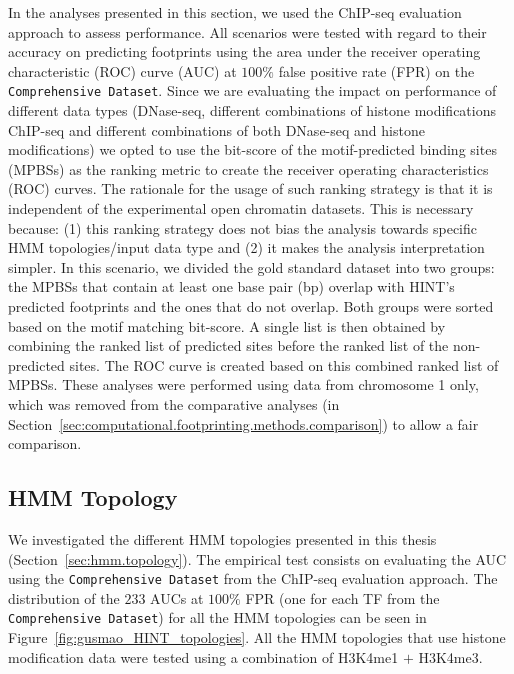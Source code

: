In the analyses presented in this section, we used the ChIP-seq evaluation approach to assess performance. All scenarios were tested with regard to their accuracy on predicting footprints using the area under the receiver operating characteristic (ROC) curve (AUC) at $100\%$ false positive rate (FPR) on the {\tt Comprehensive Dataset}. Since we are evaluating the impact on performance of different data types (DNase-seq, different combinations of histone modifications ChIP-seq and different combinations of both DNase-seq and histone modifications) we opted to use the bit-score of the motif-predicted binding sites (MPBSs) as the ranking metric to create the receiver operating characteristics (ROC) curves. The rationale for the usage of such ranking strategy is that it is independent of the experimental open chromatin datasets. This is necessary because: (1) this ranking strategy does not bias the analysis towards specific HMM topologies/input data type and (2) it makes the analysis interpretation simpler. In this scenario, we divided the gold standard dataset into two groups: the MPBSs that contain at least one base pair (bp) overlap with HINT's predicted footprints and the ones that do not overlap. Both groups were sorted based on the motif matching bit-score. A single list is then obtained by combining the ranked list of predicted sites before the ranked list of the non-predicted sites. The ROC curve is created based on this combined ranked list of MPBSs. These analyses were performed using data from chromosome 1 only, which was removed from the comparative analyses (in Section~\ref{sec:computational.footprinting.methods.comparison}) to allow a fair comparison.

\subsection{HMM Topology}
\label{sec:ps.hmm.topology}

We investigated the different HMM topologies presented in this thesis (Section~\ref{sec:hmm.topology}). The empirical test consists on evaluating the AUC using the {\tt Comprehensive Dataset} from the ChIP-seq evaluation approach. The distribution of the $233$ AUCs at $100\%$ FPR (one for each TF from the {\tt Comprehensive Dataset}) for all the HMM topologies can be seen in Figure~\ref{fig:gusmao_HINT_topologies}. All the HMM topologies that use histone modification data were tested using a combination of H3K4me1 $+$ H3K4me3.

